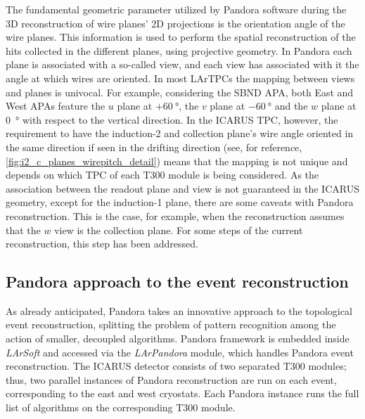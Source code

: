 The fundamental geometric parameter utilized by Pandora software during the 3D reconstruction of wire planes’ 2D projections is the orientation angle of the wire planes. This information is used to perform the spatial reconstruction of the hits collected in the different planes, using projective geometry. In Pandora each plane is associated with a so-called view, and each view has associated with it the angle at which wires are oriented. In most LArTPCs the mapping between views and planes is univocal. For example, considering the SBND APA, both East and West APAs feature the $u$ plane at $+\SI{60}{\degree}$, the $v$ plane at $-\SI{60}{\degree}$ and the $w$ plane at \SI{0}{\degree} with respect to the vertical direction. In the ICARUS TPC, however, the requirement to have the induction-2 and collection plane's wire angle oriented in the same direction if seen in the drifting direction (see, for reference, \autoref{fig:i2_c_planes_wirepitch_detail}) means that the mapping is not unique and depends on which TPC of each T300 module is being considered. As the association between the readout plane and view is not guaranteed in the ICARUS geometry, except for the induction-1 plane, there are some caveats with Pandora reconstruction. This is the case, for example, when the reconstruction assumes that the $w$ view is the collection plane. For some steps of the current reconstruction, this step has been addressed. 

\subsection{Pandora approach to the event reconstruction} \label{sec:Pandora}

As already anticipated, Pandora takes an innovative approach to the topological event reconstruction, splitting the problem of pattern recognition among the action of smaller, decoupled algorithms. Pandora framework is embedded inside \emph{LArSoft} and accessed via the \emph{LArPandora} module, which handles Pandora event reconstruction. The ICARUS detector consists of two separated T300 modules; thus, two parallel instances of Pandora reconstruction are run on each event, corresponding to the east and west cryostats. Each Pandora instance runs the full list of algorithms on the corresponding T300 module. 

